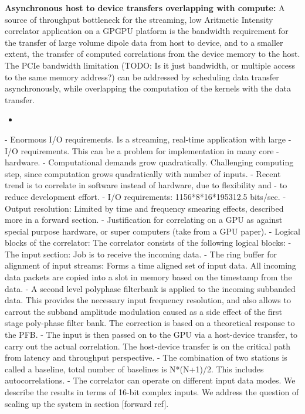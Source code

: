 \documentclass{aa}
\begin{document}
\textbf  {Asynchronous host  to device  transfers overlapping  with compute:}  A
source  of throughput  bottleneck  for the  streaming,  low Aritmetic  Intensity
correlator application on a GPGPU platform  is the bandwidth requirement for the
transfer of  large volume  dipole data  from host  to device,  and to  a smaller
extent, the  transfer of  computed correlations  from the  device memory  to the
host. The  PCIe bandwidth limitation  (TODO: Is  it just bandwidth,  or multiple
access to the same memory address?) can be addressed by scheduling data transfer
asynchronously, while overlapping  the computation of the kernels  with the data
transfer.

\begin {itemize}
  \item 
\end {itemize}
- Enormous I/O  requirements. Is a  streaming, real-time application  with large
- I/O  requirements. This  can  be a  problem for  implementation  in many  core
- hardware.   
- Computational demands  grow  quadratically. Challenging  computing step, since  
  computation grows  quadratically with  number of  inputs.
- Recent trend is to correlate in software  instead of hardware, due to flexibility and
- to reduce development effort.
- I/O requirements: 1156*8*16*195312.5 bits/sec.
- Output resolution: Limited by time and frequency smearing effects, described more in a forward section.
- Justification for correlating on a GPU as against special purpose hardware, or super computers (take from a GPU paper).
- Logical blocks of the correlator:
The correlator consists of the following logical blocks:
- The input section: Job is to receive the incoming data.
- The ring buffer for alignment of input streams: Forms a time aligned set of input data. All incoming data packets are copied into a slot in memory based on the timestamp from the data.
- A second level polyphase filterbank is applied to the incoming subbanded data. This provides the necessary input frequency resolution, and also allows to carrout the subband amplitude modulation caused as a side effect of the first stage poly-phase filter bank. The correction is based on a theoretical response to the PFB.
- The input is then passed on to the GPU via a host-device transfer, to carry out the actual correlation. The host-device transfer is on the critical path from latency and throughput perspective.
- The combination of two stations is called a baseline, total number of baselines is N*(N+1)/2. This includes autocorrelations.
- The correlator can operate on different input data modes. We describe the results in terms of 16-bit complex inputs. We address the question of scaling up the system in section [forward ref].
\end{document}
